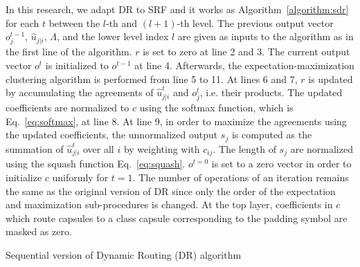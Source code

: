 \documentclass[review]{elsarticle}
\begin{document}
In this research, we adapt DR to SRF and it works as Algorithm~\ref{algorithm:sdr} for each $t$ between the $l$-th and $(l+1)$-th level.
The previous output vector $o_j^{t-1}$, $\hat{u}_{j|i}$, $\Lambda$, and the lower level index $l$ are given as inputs to the algorithm as in the first line of the algorithm.
$r$ is set to zero at line 2 and 3.
The current output vector $o^t$ is initialized to $o^{t-1}$ at line 4.
Afterwards, the expectation-maximization clustering algorithm is performed from line 5 to 11.
At lines 6 and 7, $r$ is updated by accumulating the agreements of $\hat{u}_{j|i}^t$ and $o_j^{t}$, i.e. their products.
The updated coefficients are normalized to $c$ using the softmax function, which is Eq.~\ref{eq:softmax}, at line 8.
At line 9, in order to maximize the agreements using the updated coefficients, the unnormalized output $s_j$ is computed as the summation of $\hat{u}^t_{j|i}$ over all $i$ by weighting with $c_{ij}$.
The length of $s_j$ are normalized using the squash function Eq.~\ref{eq:squash}.
$o^{t=0}$ is set to a zero vector in order to initialize $c$ uniformly for $t=1$.
The number of operations of an iteration remains the same as the original version of DR since only the order of the expectation and maximization sub-procedures is changed.
At the top layer, coefficients in $c$ which route capsules to a class capsule corresponding to the padding symbol are masked as zero.

\begin{algorithm}[H]
\caption{Sequential version of Dynamic Routing (DR) algorithm}\label{euclid}
\label{algorithm:sdr}
\end{algorithm}
\end{document}
